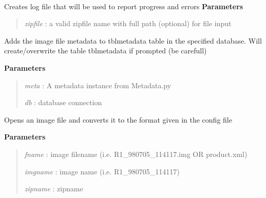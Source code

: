 \documentclass[letterpaper,10pt,english]{sphinxmanual}
\begin{document}
\begin{fulllineitems}
\label{code:SigLib.SigLib}~

\begin{fulllineitems}
\label{code:SigLib.SigLib.createLog}
Creates log file that will be used to report progress and errors
\textbf{Parameters}
\begin{quote}

\emph{zipfile} : a valid zipfile name with full path (optional) for file input
\end{quote}

\end{fulllineitems}


\begin{fulllineitems}
\label{code:SigLib.SigLib.data2db}
Adds the image file metadata to tblmetadata table in the specified database.
Will create/overwrite the table tblmetadata if prompted (be carefull)

\textbf{Parameters}
\begin{quote}

\emph{meta} :   A metadata instance from Metadata.py

\emph{db}   :   database connection
\end{quote}

\end{fulllineitems}


\begin{fulllineitems}
\label{code:SigLib.SigLib.data2img}
Opens an image file and converts it to the format given in the config file

\textbf{Parameters}
\begin{quote}

\emph{fname}    : image filename (i.e. R1\_980705\_114117.img OR product.xml)

\emph{imgname}  : image name (i.e. R1\_980705\_114117)

\emph{zipname}  : zipname


\end{quote}
\end{fulllineitems}
\end{fulllineitems}
\end{document}
